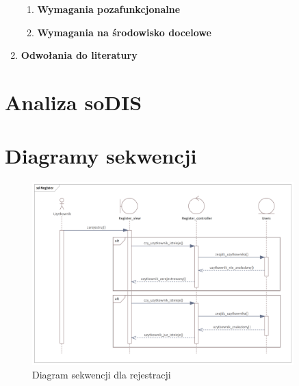 \documentclass{sprz}
\begin{document}
\begin{enumerate}[label=\textbf{\arabic*}.]
\begin{enumerate}[font=\bfseries]
      \item \textbf{Wymagania pozafunkcjonalne}
      


      \item \textbf{Wymagania na środowisko docelowe}
      


    \end{enumerate}

  \item \textbf{Odwołania do literatury}
\end{enumerate}
\clearpage

\section{Analiza soDIS}

\clearpage

\section{Diagramy sekwencji}

\begin{figure}[h]
  \centering
  \includegraphics[width=0.9\textwidth]{sprz/sequence_register}
  \caption{Diagram sekwencji dla rejestracji}
  \label{img:sequence_register}
\end{figure}
\end{document}
